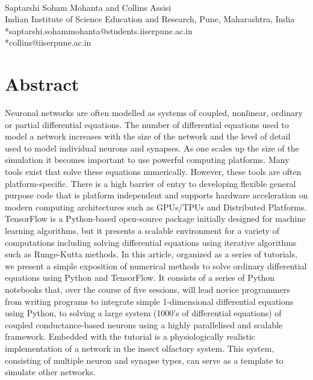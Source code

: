 \documentclass[10pt,letterpaper]{article}
\begin{document}
\vspace*{0.2in}

\begin{flushleft}
{\Large
\textbf{} %
}\\
Saptarshi Soham Mohanta and Collins Assisi
\bigskip
\\
Indian Institute of Science Education and Research, Pune, Maharashtra, India\\
\bigskip
*saptarshi.sohammohanta@students.iiserpune.ac.in \\
*collins@iiserpune.ac.in

\end{flushleft}
\section*{Abstract}
Neuronal networks are often modelled as systems of coupled, nonlinear, ordinary or
partial differential equations. The number of differential equations used to model a
network increases with the size of the network and the level of detail used to model
individual neurons and synapses. As one scales up the size of the simulation it becomes important to use powerful computing platforms. Many tools exist that solve these equations numerically. However, these tools are often platform-specific. There is a high barrier of entry to developing flexible general purpose code that is platform independent and supports hardware acceleration on modern computing architectures such as GPUs/TPUs and Distributed Platforms. TensorFlow is a Python-based open-source package initially designed for machine learning algorithms, but it presents a scalable environment for a variety of computations including solving differential equations using iterative algorithms such as Runge-Kutta methods. In this article, organized as a series of tutorials, we present a simple exposition of numerical methods to solve ordinary differential equations using Python and TensorFlow. It consists of a series of Python notebooks that, over the course of five sessions, will lead novice programmers from writing programs to integrate simple 1-dimensional differential equations using Python, to solving a large system (1000’s of differential equations) of coupled conductance-based neurons using a highly parallelised and scalable framework. Embedded with the tutorial is a physiologically realistic implementation of a network in the insect olfactory system. This system, consisting of multiple neuron and synapse types, can serve as a template to simulate other networks.
\end{document}
